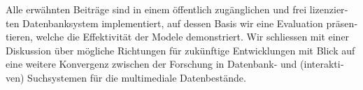 \begin{otherlanguage}{ngerman}
Alle erwähnten Beiträge sind in einem öffentlich zugänglichen und frei lizenzierten Datenbanksystem \cottontail{} implementiert, auf dessen Basis wir eine Evaluation präsentieren, welche die Effektivität der Modele demonstriert. Wir schliessen mit einer Diskussion über mögliche Richtungen für zukünftige Entwicklungen mit Blick auf eine weitere Konvergenz zwischen der Forschung in Datenbank- und (interaktiven) Suchsystemen für die multimediale Datenbestände.
\end{otherlanguage}

\cleardoublepage
